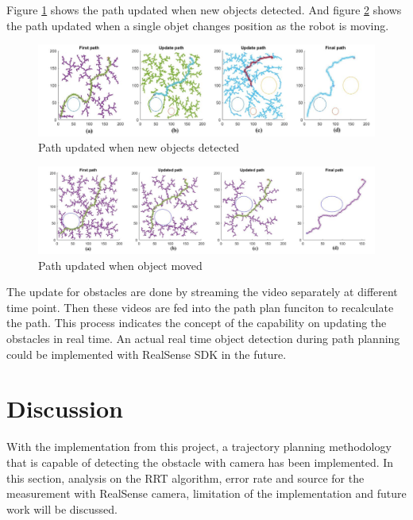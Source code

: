 \documentclass[
  oneside]{ubcthesis}
\begin{document}
Figure \ref{fig:figure10} shows the path updated when new objects detected. And figure \ref{fig:figure11} shows the path updated when a single objet changes position as the robot is moving.

\begin{figure}

{\centering \includegraphics[width=0.9\linewidth]{figures/10} 

}

\caption{Path updated when new objects detected}\label{fig:figure10}
\end{figure}



\begin{figure}

{\centering \includegraphics[width=0.9\linewidth]{figures/11} 

}

\caption{Path updated when object moved}\label{fig:figure11}
\end{figure}



The update for obstacles are done by streaming the video separately at different time point. Then these videos are fed into the path plan funciton to recalculate the path. This process indicates the concept of the capability on updating the obstacles in real time. An actual real time object detection during path planning could be implemented with RealSense SDK in the future.

\hypertarget{discussion}{%
\chapter{Discussion}\label{discussion}}

With the implementation from this project, a trajectory planning methodology that is capable of detecting the obstacle with camera has been implemented. In this section, analysis on the RRT algorithm, error rate and source for the measurement with RealSense camera, limitation of the implementation and future work will be discussed.
\end{document}
